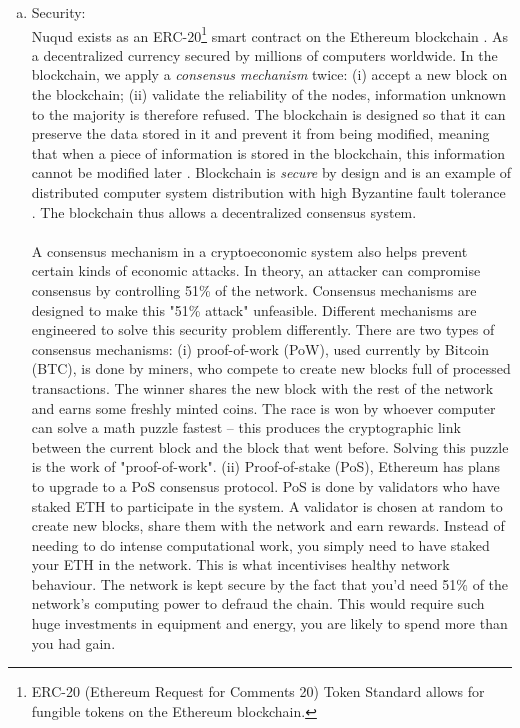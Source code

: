 \documentclass[12pt]{article}
\begin{document}
\begin{enumerate}[(a)]
\item Security:\\
Nuqud exists as an ERC-20\footnote{ERC-20 (Ethereum Request for Comments 20) Token Standard allows for fungible tokens on the Ethereum blockchain.} smart contract on the Ethereum blockchain \cite{oliva2020exploratory}. As a decentralized currency secured by millions of computers worldwide. In the blockchain, we apply a \emph{consensus mechanism} twice: (i) accept a new block on the blockchain; (ii) validate the reliability of the nodes, information unknown to the majority is therefore refused. The blockchain is designed so that it can preserve the data stored in it and prevent it from being modified, meaning that when a piece of information is stored in the blockchain, this information cannot be modified later \cite{zheng2017overview}\cite{tsankov2018securify}. Blockchain is \emph{secure} by design and is an example of distributed computer system distribution with high Byzantine fault tolerance \cite{kirrmann2005fault}. The blockchain thus allows a decentralized consensus system.\\
{}\\
A consensus mechanism in a cryptoeconomic system also helps prevent certain kinds of economic attacks. In theory, an attacker can compromise consensus by controlling 51\% of the network. Consensus mechanisms are designed to make this "51\% attack" unfeasible. Different mechanisms are engineered to solve this security problem differently. There are two types of consensus mechanisms: (i) proof-of-work (PoW), used currently by Bitcoin (BTC), is done by miners, who compete to create new blocks full of processed transactions. The winner shares the new block with the rest of the network and earns some freshly minted coins. The race is won by whoever computer can solve a math puzzle fastest – this produces the cryptographic link between the current block and the block that went before. Solving this puzzle is the work of "proof-of-work". (ii) Proof-of-stake (PoS), Ethereum has plans to upgrade to a PoS consensus protocol. PoS is done by validators who have staked ETH to participate in the system. A validator is chosen at random to create new blocks, share them with the network and earn rewards. Instead of needing to do intense computational work, you simply need to have staked your ETH in the network. This is what incentivises healthy network behaviour. The network is kept secure by the fact that you'd need 51\% of the network's computing power to defraud the chain. This would require such huge investments in equipment and energy, you are likely to spend more than you had gain.
\end{enumerate}
\end{document}
